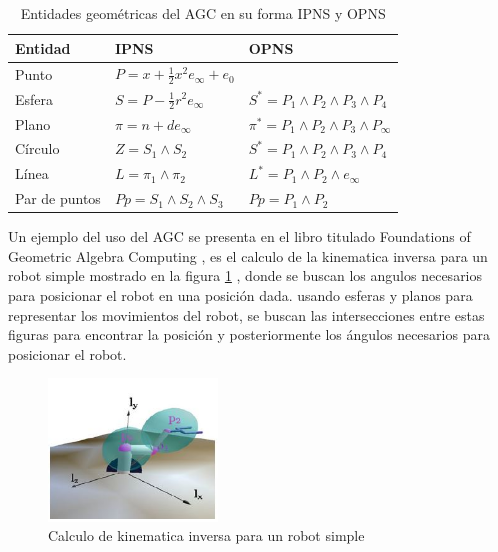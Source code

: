         \begin{table}[!htb]
            \centering
            \caption{Entidades geométricas del AGC en su forma IPNS y OPNS}
            \label{AGCEntitis}
            \begin{tabular}{lll}
                \hline
                Entidad       & IPNS & OPNS \\ \hline
                Punto         & $P=x+\frac{1}{2}x^2e_\infty+e_0$     &      \\
                Esfera        & $S=P-\frac{1}{2}r^2 e_\infty$ &  $S^*=P_1\wedge P_2\wedge P_3\wedge P_4 $ \\
                Plano         & $\pi = n+de_\infty$     & $\pi^*=P_1\wedge P_2\wedge P_3\wedge P_\infty$      \\
                Círculo       & $Z=S_1\wedge S_2$     & $S^*=P_1\wedge P_2\wedge P_3\wedge P_4 $    \\
                Línea         & $L=\pi_1 \wedge \pi_2$     & $L^*=P_1 \wedge P_2 \wedge e_\infty$      \\
                Par de puntos & $Pp=S_1 \wedge S_2 \wedge S_3$     &    $Pp=P_1 \wedge P_2$  \\ \hline
            \end{tabular}
        \end{table}
    
    
    Un ejemplo del uso del AGC se presenta en el libro titulado Foundations of Geometric Algebra Computing \cite{FoundOfAGC}, es el calculo de la kinematica inversa para un robot simple mostrado en la figura \ref{fig:ejemplo}  , donde se buscan los angulos necesarios para posicionar el robot en una posición dada. usando esferas y planos para representar los movimientos del robot, se buscan las intersecciones entre estas figuras para encontrar la posición y posteriormente los ángulos necesarios para posicionar el robot.\\
    
    
    \begin{figure}[!htb]
    	\centering
    	\includegraphics[width=0.4\textwidth]{01Introduccion/imagenes/ejemplo.jpg}
    	\caption{Calculo de kinematica inversa para un robot simple} 
    	\label{fig:ejemplo}
    \end{figure}
    
